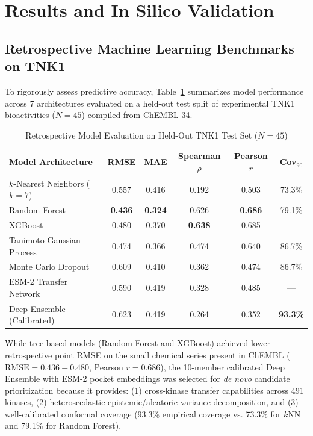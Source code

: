 \documentclass[journal]{IEEEtran}
\begin{document}
\section{Results and In Silico Validation}

\subsection{Retrospective Machine Learning Benchmarks on TNK1}
To rigorously assess predictive accuracy, Table~\ref{tab:retrospective_baselines} summarizes model performance across 7 architectures evaluated on a held-out test split of experimental TNK1 bioactivities ($N=45$) compiled from ChEMBL 34.

\begin{table}[!t]
\caption{Retrospective Model Evaluation on Held-Out TNK1 Test Set ($N=45$)}
\label{tab:retrospective_baselines}
\centering
\begin{tabular}{lccccc}
\toprule
\textbf{Model Architecture} & \textbf{RMSE} & \textbf{MAE} & \textbf{Spearman $\rho$} & \textbf{Pearson $r$} & \textbf{Cov$_{90}$} \\
\midrule
$k$-Nearest Neighbors ($k=7$) & 0.557 & 0.416 & 0.192 & 0.503 & 73.3\% \\
Random Forest & \textbf{0.436} & \textbf{0.324} & 0.626 & \textbf{0.686} & 79.1\% \\
XGBoost & 0.480 & 0.370 & \textbf{0.638} & 0.685 & --- \\
Tanimoto Gaussian Process & 0.474 & 0.366 & 0.474 & 0.640 & 86.7\% \\
Monte Carlo Dropout & 0.609 & 0.410 & 0.362 & 0.474 & 86.7\% \\
ESM-2 Transfer Network & 0.590 & 0.419 & 0.328 & 0.485 & --- \\
Deep Ensemble (Calibrated) & 0.623 & 0.419 & 0.264 & 0.352 & \textbf{93.3\%} \\
\bottomrule
\end{tabular}
\end{table}

While tree-based models (Random Forest and XGBoost) achieved lower retrospective point RMSE on the small chemical series present in ChEMBL ($\text{RMSE} = 0.436 - 0.480$, Pearson $r = 0.686$), the 10-member calibrated Deep Ensemble with ESM-2 pocket embeddings was selected for \textit{de novo} candidate prioritization because it provides: (1) cross-kinase transfer capabilities across 491 kinases, (2) heteroscedastic epistemic/aleatoric variance decomposition, and (3) well-calibrated conformal coverage (93.3\% empirical coverage vs. 73.3\% for $k\text{NN}$ and 79.1\% for Random Forest).
\end{document}
